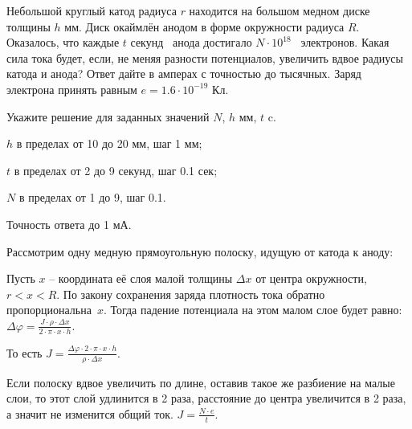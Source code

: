 
Небольшой круглый катод радиуса $r$ находится на большом медном диске толщины $h$ мм. Диск окаймлён анодом в форме окружности радиуса
$R$. Оказалось, что каждые $t$ секунд  анода достигало $N \cdot 10^{18}$  электронов. Какая сила тока будет, если, не
меняя разности потенциалов, увеличить вдвое радиусы катода и анода? Ответ дайте в амперах с точностью до тысячных. Заряд электрона
принять равным \linebreak $e = 1.6 \cdot 10^{-19}$ Кл.

Укажите решение для заданных значений $N$, $h$ мм, $t$ c.

\paramSection

$h$ в пределах от 10 до 20 мм, шаг  1 мм;   

$t$ в пределах от 2 до 9 секунд, шаг 0.1 сек;

$N$ в пределах от 1 до 9, шаг 0.1.

Точность ответа  до  1 мА.

\solutionSection

Рассмотрим одну медную прямоугольную полоску, идущую от катода к аноду:


Пусть $x$ –  координата её слоя малой толщины $\Delta x$ от центра окружности, \linebreak $r<x<R$. По закону 
сохранения заряда плотность тока обратно пропорциональна~$x$. Тогда падение потенциала на этом малом 
слое будет равно: $\Delta \varphi=\frac{J \cdot \rho  \cdot \Delta x}{2 \cdot \pi \cdot x \cdot h}$.  

То есть $J=\frac{\Delta \varphi \cdot 2 \cdot \pi \cdot x \cdot h}{\rho  \cdot \Delta x}$.

Если полоску вдвое увеличить по длине, оставив такое же разбиение на малые слои, то этот слой удлинится 
в 2 раза, расстояние до центра увеличится в 2 раза, а значит не изменится общий ток. $J = \frac{N \cdot e}{t}$.


